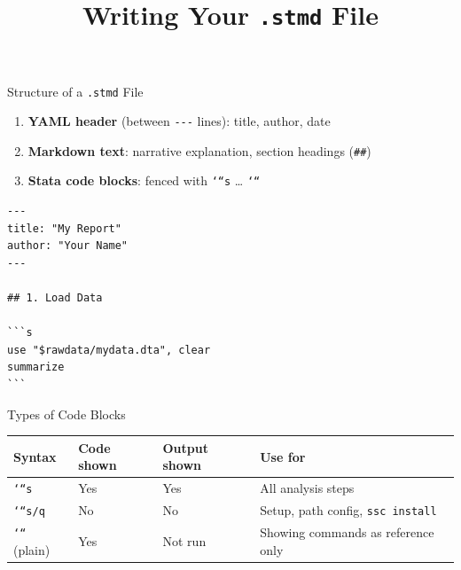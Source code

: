 \documentclass[dvipsnames,hyperref={pdfpagelabels=false}]{beamer}
\begin{document}
\title[]{Writing Your \texttt{.stmd} File}
\author{}\institute{}\date{}
\begin{frame}{}
  \titlepage
\end{frame}

\begin{frame}[fragile]{Structure of a \texttt{.stmd} File}
  \begin{enumerate}
    \item \textbf{YAML header} (between \texttt{-{}-{}-} lines): title, author, date
    \item \textbf{Markdown text}: narrative explanation, section headings (\texttt{\#\#})
    \item \textbf{Stata code blocks}: fenced with \texttt{`{}``s} \ldots{} \texttt{`{}``}
  \end{enumerate}

  \vspace{0.5em}
  \begin{lstlisting}[language={},backgroundcolor=\color{gray!6}]
---
title: "My Report"
author: "Your Name"
---

## 1. Load Data

```s
use "$rawdata/mydata.dta", clear
summarize
```
  \end{lstlisting}
\end{frame}

\begin{frame}{Types of Code Blocks}
  \begin{center}
    \begin{tabular}{llll}
      \toprule
      \textbf{Syntax} & \textbf{Code shown} & \textbf{Output shown} & \textbf{Use for} \\
      \midrule
      \texttt{`{}``s}     & Yes & Yes & All analysis steps \\
      \texttt{`{}``s/q}   & No  & No  & Setup, path config, \texttt{ssc install} \\
      \texttt{`{}``} (plain) & Yes & Not run & Showing commands as reference only \\
      \bottomrule
    \end{tabular}
  \end{center}
\end{frame}
\end{document}
